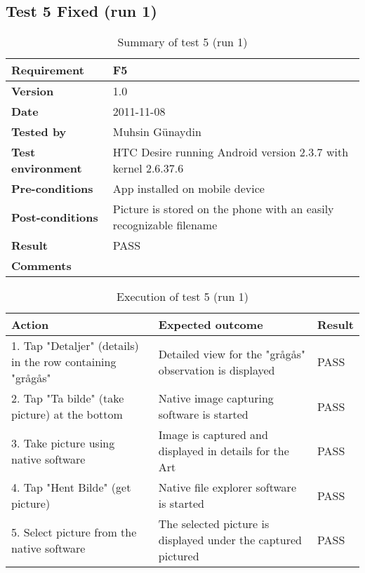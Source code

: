 
\subsection*{Test 5 Fixed (run 1)}

	\begin{table}[htb]
		\centering
		\begin{tabular}{|p{3.5cm}|p{7.0cm}|} \hline
			\textbf{Requirement} & F5 \\ \hline
			\textbf{Version} & 1.0 \\ \hline
			\textbf{Date} & 2011-11-08 \\ \hline
			\textbf{Tested by} & Muhsin Günaydin \\ \hline
			\textbf{Test environment} & HTC Desire running Android version 2.3.7 with kernel 2.6.37.6 \\ \hline
			\textbf{Pre-conditions} & App installed on mobile device \\ \hline
			\textbf{Post-conditions} & Picture is stored on the phone with an easily recognizable filename \\ \hline
			\textbf{Result} & PASS \\ \hline
			\textbf{Comments} & \\ \hline
		\end{tabular}
		\caption{Summary of test 5 (run 1)}
	\end{table}

	\begin{table}[htb]
		\centering
		\begin{tabular}{|p{5.0cm}|p{5.0cm}|p{1cm}|}
			\hline \textbf{Action} & \textbf{Expected outcome} & \textbf{Result} \\ \hline
			1. Tap "Detaljer" (details) in the row containing "grågås"  &
			Detailed view for the "grågås" observation is displayed & 
			PASS \\ \hline

			2. Tap "Ta bilde" (take picture) at the bottom &
			Native image capturing software is started &
			PASS\\ \hline

			3. Take picture using native software &
			Image is captured and displayed in details for the Art &
			PASS\\ \hline
			
			4. Tap "Hent Bilde" (get picture) &
			Native file explorer software is started &
			PASS\\ \hline

			5. Select picture from the native software &
			The selected picture is displayed under the captured pictured &
			PASS\\ \hline
		
		\end{tabular}
		\caption{Execution of test 5 (run 1)}
	\end{table}


\newpage
